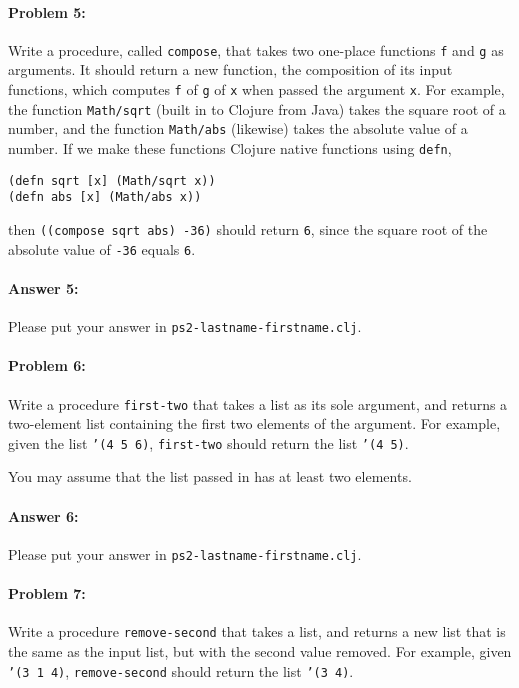 \documentclass[10pt]{article}
\newcommand{\PSnum}{2}
\begin{document}
\paragraph{Problem 5:}
Write a procedure, called \texttt{compose}, that takes two one-place
functions \texttt{f} and \texttt{g} as arguments. It should return a
new function, the composition of its input functions, which computes
\texttt{f} of \texttt{g} of \texttt{x} when passed the argument \texttt{x}. For example, the
function \texttt{Math/sqrt} (built in to Clojure from Java) takes the
square root of a number, and the function \texttt{Math/abs} (likewise) 
takes the absolute value of a number. If we make
these functions Clojure native functions using \texttt{defn}, 
\begin{lstlisting}
(defn sqrt [x] (Math/sqrt x))
(defn abs [x] (Math/abs x))
\end{lstlisting}
then
\texttt{((compose sqrt abs) -36)} should return \texttt{6},
since the square root of the absolute value of \texttt{-36} equals
\texttt{6}.

\paragraph{Answer 5:} Please put your answer in \texttt{ps\PSnum-lastname-firstname.clj}.

\noindent\hrulefill %

\paragraph{Problem 6:}
  Write a procedure \texttt{first-two} that takes a list as its sole argument,
  and returns a two-element list containing the first two elements of
  the argument. For example, given the list \texttt{'(4 5 6)},
  \texttt{first-two} should return the list \texttt{'(4 5)}.

  You may assume that the list passed in has at least two elements.

\paragraph{Answer 6:} Please put your answer in \texttt{ps\PSnum-lastname-firstname.clj}.

\noindent\hrulefill %

\paragraph{Problem 7:}
Write a procedure \texttt{remove-second} that takes a list, and
returns a new list that is the same as the input list, but with 
the second value removed. For example, given \texttt{'(3 1 4)},
\texttt{remove-second} should return the list \texttt{'(3 4)}.
\end{document}
